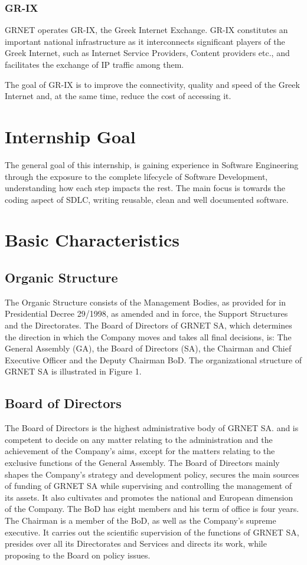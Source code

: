 \subsubsection{GR-IX}
GRNET operates GR-IX, the Greek Internet Exchange.
GR-IX constitutes an important national infrastructure
as it interconnects significant players of the Greek Internet,
such as Internet Service Providers, Content providers etc.,
and facilitates the exchange of IP traffic among them.

The goal of GR-IX is to improve the connectivity,
quality and speed of the Greek Internet and,
at the same time, reduce the cost of accessing it.

\section{Internship Goal}
The general goal of this internship, is gaining experience in Software Engineering through the exposure to the complete lifecycle of Software Development, understanding how each step impacts the rest. The main focus is towards the coding aspect of SDLC, writing reusable, clean and well documented software.

\section{Basic Characteristics}\label{ch:basic_characteristics}

\subsection{Organic Structure}
The Organic Structure consists of the Management Bodies,
as provided for in Presidential Decree 29/1998,
as amended and in force, the Support Structures and the Directorates.
The Board of Directors of GRNET SA,
which determines the direction in which the Company moves and takes all final decisions, is:
The General Assembly (GA), the Board of Directors (SA),
the Chairman and Chief Executive Officer and the Deputy Chairman BoD.
The organizational structure of GRNET SA is illustrated in Figure 1.

\subsection{Board of Directors}
The Board of Directors is the highest administrative body of GRNET SA.
and is competent to decide on any matter relating to the administration and the achievement of the Company's aims,
except for the matters relating to the exclusive functions of the General Assembly.
The Board of Directors mainly shapes the Company's strategy and development policy,
secures the main sources of funding of GRNET SA while supervising and controlling the management of its assets.
It also cultivates and promotes the national and European dimension of the Company.
The BoD has eight members and his term of office is four years.
The Chairman is a member of the BoD, as well as the Company's supreme executive.
It carries out the scientific supervision of the functions of GRNET SA,
presides over all its Directorates and Services and directs its work, while proposing to the Board on policy issues.

